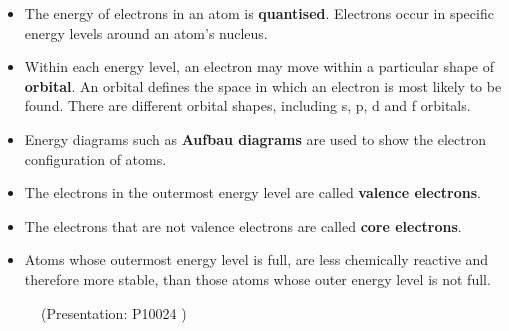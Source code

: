 \begin{itemize}[noitemsep]
\label{m38741*uid178}\item The energy of electrons in an atom is \textbf{quantised}. Electrons occur in specific energy levels around an atom's nucleus.
\label{m38741*uid179}\item Within each energy level, an electron may move within a particular shape of \textbf{orbital}. An orbital defines the space in which an electron is most likely to be found. There are different orbital shapes, including s, p, d and f orbitals.
\label{m38741*uid180}\item Energy diagrams such as \textbf{Aufbau diagrams} are used to show the electron configuration of atoms.
\label{m38741*uid181}\item The electrons in the outermost energy level are called \textbf{valence electrons}.
\label{m38741*uid182}\item The electrons that are not valence electrons are called \textbf{core electrons}.
\label{m38741*uid183}\item Atoms whose outermost energy level is full, are less chemically reactive and therefore more stable, than those atoms whose outer energy level is not full.
\end{itemize}
\label{m38741*eip-867}
    \setcounter{subfigure}{0}
	\begin{figure}[H] %
    \label{m38741*slidesharemedia2}\label{m38741*slideshareflash2}
             { (Presentation:  P10024 )}
      \vspace{2pt}
    \vspace{.1in}
 \end{figure}       \par \label{m38741*secfhsst!!!underscore!!!id1140}
            

